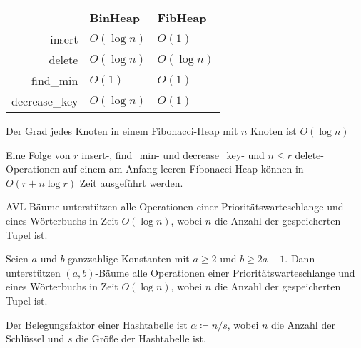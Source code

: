 \documentclass{cheat-sheet}
\begin{document}



\begin{center}
  \begin{tabular}{r | l l}
    & BinHeap & FibHeap \\ \hline
    insert & $O(\log n)$ & $O(1)$ \\
    delete & $O(\log n)$ & $O(\log n)$ \\
    find_min & $O(1)$ & $O(1)$ \\
    decrease_key & $O(\log n)$ & $O(1)$ \\
  \end{tabular}
\end{center}


\begin{satz}
  Der Grad jedes Knoten in einem Fibonacci-Heap mit $n$ Knoten ist $O(\log n)$
\end{satz}

\begin{satz}
  Eine Folge von $r$ insert-, find_min- und decrease_key- und $n \leq r$ delete-Operationen auf einem am Anfang leeren Fibonacci-Heap können in $O(r + n \log r)$ Zeit ausgeführt werden.
\end{satz}




\begin{satz}
  AVL-Bäume unterstützen alle Operationen einer Prioritätswarteschlange und eines Wörterbuchs in Zeit $O(\log n)$, wobei $n$ die Anzahl der gespeicherten Tupel ist.
\end{satz}

\begin{satz}
  Seien $a$ und $b$ ganzzahlige Konstanten mit $a \geq 2$ und $b \geq 2 a - 1$. Dann unterstützen $(a, b)$-Bäume alle Operationen einer Prioritätswarteschlange und eines Wörterbuchs in Zeit $O(\log n)$, wobei $n$ die Anzahl der gespeicherten Tupel ist.
\end{satz}

\begin{defn}
  Der Belegungsfaktor einer Hashtabelle ist $\alpha \coloneqq n / s$, wobei $n$ die Anzahl der Schlüssel und $s$ die Größe der Hashtabelle ist.
\end{defn}
\end{document}
